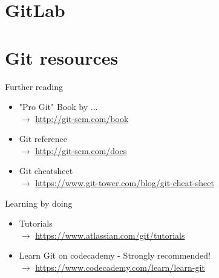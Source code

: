\documentclass[10pt,xcolor=dvipsnames]{beamer}
\begin{document}
\section{GitLab}

\section{Git resources}
\begin{frame}{Further reading}
\begin{itemize}
  \setlength\itemsep{0.4in}
\item "Pro Git" Book by ... \\$\rightarrow$  \url{http://git-scm.com/book}
\item Git reference  \\ $\rightarrow$  \url{http://git-scm.com/docs}
\item Git cheatsheet  \\ $\rightarrow$ \url{https://www.git-tower.com/blog/git-cheat-sheet}
\end{itemize}
\end{frame}

\begin{frame}{Learning by doing}
\begin{itemize}
  \setlength\itemsep{0.4in}
\item Tutorials  \\$\rightarrow$  \url{https://www.atlassian.com/git/tutorials}
\item Learn Git on codecademy - Strongly recommended!\\ $\rightarrow$ \url{https://www.codecademy.com/learn/learn-git}
\end{itemize}
\end{frame}
\end{document}
